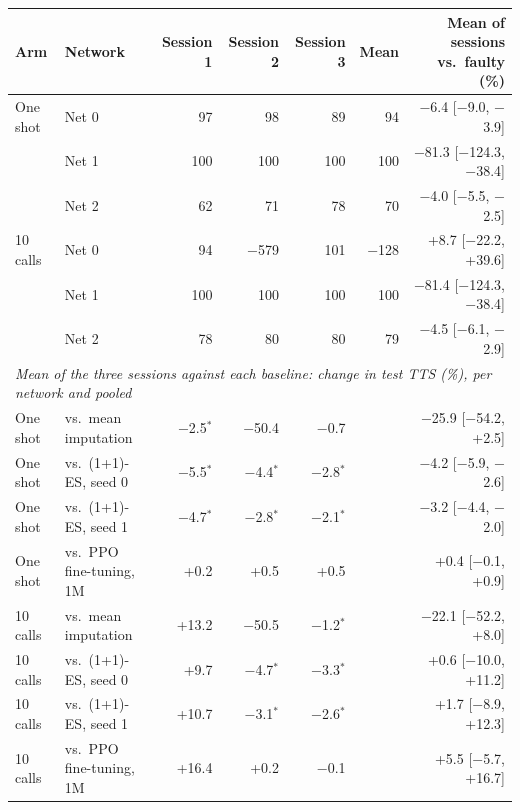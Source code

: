 \begin{tabular}{llrrrrr}
\toprule
Arm & Network & Session 1 & Session 2 & Session 3 & Mean & Mean of sessions vs.\ faulty (\%) \\
\midrule
One shot & Net 0 & 97 & 98 & 89 & 94 & $-$6.4 [$-$9.0, $-$3.9] \\
 & Net 1 & 100 & 100 & 100 & 100 & $-$81.3 [$-$124.3, $-$38.4] \\
 & Net 2 & 62 & 71 & 78 & 70 & $-$4.0 [$-$5.5, $-$2.5] \\
\midrule
10 calls & Net 0 & 94 & $-$579 & 101 & $-$128 & +8.7 [$-$22.2, +39.6] \\
 & Net 1 & 100 & 100 & 100 & 100 & $-$81.4 [$-$124.3, $-$38.4] \\
 & Net 2 & 78 & 80 & 80 & 79 & $-$4.5 [$-$6.1, $-$2.9] \\
\midrule
\multicolumn{7}{l}{\emph{Mean of the three sessions against each baseline: change in test TTS (\%), per network and pooled}} \\
One shot & vs.\ mean imputation & $-$2.5$^{*}$ & $-$50.4 & $-$0.7 & & $-$25.9 [$-$54.2, +2.5] \\
One shot & vs.\ (1+1)-ES, seed 0 & $-$5.5$^{*}$ & $-$4.4$^{*}$ & $-$2.8$^{*}$ & & $-$4.2 [$-$5.9, $-$2.6] \\
One shot & vs.\ (1+1)-ES, seed 1 & $-$4.7$^{*}$ & $-$2.8$^{*}$ & $-$2.1$^{*}$ & & $-$3.2 [$-$4.4, $-$2.0] \\
One shot & vs.\ PPO fine-tuning, 1M & +0.2 & +0.5 & +0.5 & & +0.4 [$-$0.1, +0.9] \\
\midrule
10 calls & vs.\ mean imputation & +13.2 & $-$50.5 & $-$1.2$^{*}$ & & $-$22.1 [$-$52.2, +8.0] \\
10 calls & vs.\ (1+1)-ES, seed 0 & +9.7 & $-$4.7$^{*}$ & $-$3.3$^{*}$ & & +0.6 [$-$10.0, +11.2] \\
10 calls & vs.\ (1+1)-ES, seed 1 & +10.7 & $-$3.1$^{*}$ & $-$2.6$^{*}$ & & +1.7 [$-$8.9, +12.3] \\
10 calls & vs.\ PPO fine-tuning, 1M & +16.4 & +0.2 & $-$0.1 & & +5.5 [$-$5.7, +16.7] \\
\bottomrule
\end{tabular}
